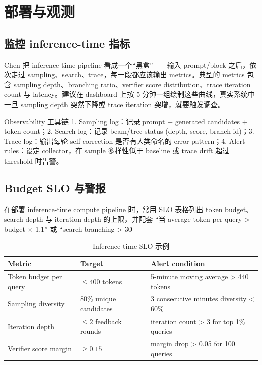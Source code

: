 \section{部署与观测}

\subsection{监控 inference-time 指标}
Chen 把 inference-time pipeline 看成一个“黑盒”——输入 prompt/block 之后，依次走过 sampling、search、trace，每一段都应该输出 metrics。典型的 metrics 包含 sampling depth、branching ratio、verifier score distribution、trace iteration count 与 latency。建议在 dashboard 上按 5 分钟一组绘制这些曲线，真实系统中一旦 sampling depth 突然下降或 trace iteration 突增，就要触发调查。

\begin{knowledgebox}{Observability 工具链}
1. Sampling log：记录 prompt + generated candidates + token count；2. Search log：记录 beam/tree status (depth, score, branch id)；3. Trace log：输出每轮 self-correction 是否有人类命名的 error pattern；4. Alert rules：设定 collector，在 sample 多样性低于 baseline 或 trace drift 超过 threshold 时告警。
\end{knowledgebox}

\subsection{Budget SLO 与警报}
在部署 inference-time compute pipeline 时，常用 SLO 表格列出 token budget、search depth 与 iteration depth 的上限，并配套 “当 average token per query > budget × 1.1” 或 “search branching > 30%

\begin{table}[H]
\centering
\caption{Inference-time SLO 示例}
\begin{tabular}{p{}p{}p{}}
\toprule
Metric & Target & Alert condition \\
\midrule
Token budget per query & $\leq 400$ tokens & 5-minute moving average > 440 tokens \\
Sampling diversity & 80\% unique candidates & 3 consecutive minutes diversity < 60\% \\
Iteration depth & $\leq 2$ feedback rounds & iteration count > 3 for top 1\% queries \\
Verifier score margin & $\geq 0.15$ & margin drop > 0.05 for 100 queries \\
\bottomrule
\end{tabular}
\end{table}

